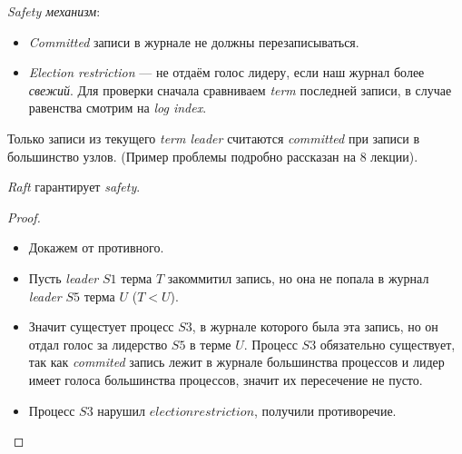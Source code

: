 \newpage
\begin{definition} \textit{Safety механизм}:
    \begin{itemize}
        \item \textit{Committed} записи в журнале не должны перезаписываться.
        \item \textit{Election restriction} --- не отдаём голос лидеру,
            если наш журнал более \textit{свежий}. Для проверки сначала сравниваем
            \textit{term} последней записи, в случае равенства смотрим на \textit{log index}.
    \end{itemize}
\end{definition}

\begin{remark}
    Только записи из текущего \textit{term leader} считаются
    \textit{committed} при записи в большинство узлов. (Пример проблемы подробно
    рассказан на 8 лекции).
\end{remark}

\begin{theorem}
    \textit{Raft} гарантирует \textit{safety}.
\end{theorem}
\begin{proof}
    \enewline
    \begin{itemize}
        \item Докажем от противного.
        \item Пусть \textit{leader} $S1$ терма $T$ закоммитил запись, но она не попала
            в журнал \textit{leader} $S5$ терма $U$ ($T < U$).
        \item Значит сущестует процесс $S3$, в журнале которого была эта запись, но
            он отдал голос за лидерство $S5$ в терме $U$. Процесс $S3$ обязательно существует,
            так как \textit{commited} запись лежит в журнале большинства процессов и лидер
            имеет голоса большинства процессов, значит их пересечение не пусто.
        \item Процесс $S3$ нарушил $election restriction$, получили противоречие.
    \end{itemize}
\end{proof}
